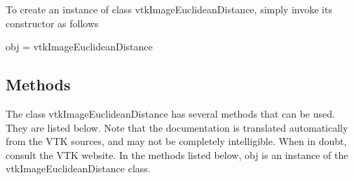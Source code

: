 To create an instance of class vtk\-Image\-Euclidean\-Distance, simply invoke its constructor as follows \begin{DoxyVerb}  obj = vtkImageEuclideanDistance
\end{DoxyVerb}
 \hypertarget{vtkwidgets_vtkxyplotwidget_Methods}{}\subsection{Methods}\label{vtkwidgets_vtkxyplotwidget_Methods}
The class vtk\-Image\-Euclidean\-Distance has several methods that can be used. They are listed below. Note that the documentation is translated automatically from the V\-T\-K sources, and may not be completely intelligible. When in doubt, consult the V\-T\-K website. In the methods listed below, {\ttfamily obj} is an instance of the vtk\-Image\-Euclidean\-Distance class. 
